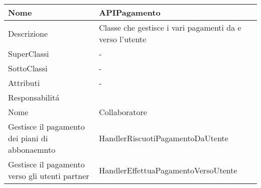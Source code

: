 \begin{center}
    \begin{longtable}{ |p{3cm}|p{3cm}|p{3cm}|p{3cm}| }
        \hline
        Nome & \multicolumn{3}{|p{9cm}|}{APIPagamento} \\\hline
        Descrizione & \multicolumn{3}{|p{9cm}|}{Classe che gestisce i vari pagamenti da e verso l'utente} \\\hline
        SuperClassi & \multicolumn{3}{|p{9cm}|}{-} \\\hline
        SottoClassi & \multicolumn{3}{|p{9cm}|}{-} \\\hline
        Attributi & \multicolumn{3}{|p{9cm}|}{-} \\\hline
        \multicolumn{4}{|p{12cm}|}{Responsabilit\'a} \\\hline
        \multicolumn{2}{|p{6cm}|}{Nome} & \multicolumn{2}{|p{6cm}|}{Collaboratore} \\\hline
        \multicolumn{2}{|p{6cm}|}{Gestisce il pagamento dei piani di abbonaemnto} & \multicolumn{2}{|p{6cm}|}{HandlerRiscuotiPagamentoDaUtente} \\\hline
        \multicolumn{2}{|p{6cm}|}{Gestisce il pagamento verso gli utenti partner} & \multicolumn{2}{|p{6cm}|}{HandlerEffettuaPagamentoVersoUtente} \\\hline
    \end{longtable}
\end{center}

